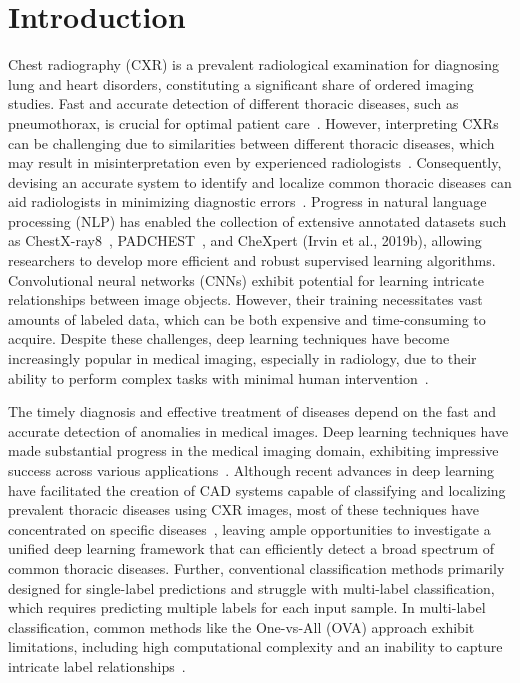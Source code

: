 \section{Introduction}

Chest radiography (CXR) is a prevalent radiological examination for diagnosing lung and heart disorders, constituting a significant share of ordered imaging studies. Fast and accurate detection of different thoracic diseases, such as pneumothorax, is crucial for optimal patient care~\cite{bellaviti_Increased_2016}. However, interpreting CXRs can be challenging due to similarities between different thoracic diseases, which may result in misinterpretation even by experienced radiologists~\cite{delrue_Difficulties_2011}. Consequently, devising an accurate system to identify and localize common thoracic diseases can aid radiologists in minimizing diagnostic errors~\cite{crisp_Global_2014,silverstein_Most_2016}.
Progress in natural language processing (NLP) has enabled the collection of extensive annotated datasets such as ChestX-ray8~\cite{wang_ChestXRay8_2017}, PADCHEST~\cite{bustos_Padchest_2020}, and CheXpert (Irvin et al., 2019b), allowing researchers to develop more efficient and robust supervised learning algorithms. 
Convolutional neural networks (CNNs) exhibit potential for learning intricate relationships between image objects. However, their training necessitates vast amounts of labeled data, which can be both expensive and time-consuming to acquire. Despite these challenges, deep learning techniques have become increasingly popular in medical imaging, especially in radiology, due to their ability to perform complex tasks with minimal human intervention~\cite{jaderberg_Spatial_2015}. 

The timely diagnosis and effective treatment of diseases depend on the fast and accurate detection of anomalies in medical images. Deep learning techniques have made substantial progress in the medical imaging domain, exhibiting impressive success across various applications~\cite{litjens_Survey_2017a,eshghali_Machine_2023}.  Although recent advances in deep learning have facilitated the creation of CAD systems capable of classifying and localizing prevalent thoracic diseases using CXR images, most of these techniques have concentrated on specific diseases~\cite{jaiswal_Identifying_2019,lakhani_Deep_2017,pasa_Efficient_2019,ausawalaithong_Automatic_2018}, leaving ample opportunities to investigate a unified deep learning framework that can efficiently detect a broad spectrum of common thoracic diseases. Further, conventional classification methods primarily designed for single-label predictions and struggle with multi-label classification, which requires predicting multiple labels for each input sample. In multi-label classification, common methods like the One-vs-All (OVA) approach exhibit limitations, including high computational complexity and an inability to capture intricate label relationships~\cite{tsoumakas_MultiLabel_2007}. 

